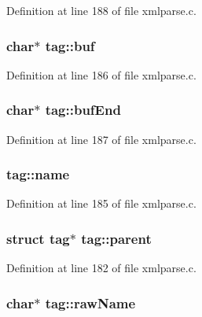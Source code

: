 Definition at line 188 of file xmlparse.\+c.

\subsubsection[{\texorpdfstring{buf}{buf}}]{\setlength{\rightskip}{0pt plus 5cm}char$\ast$ tag\+::buf}\hypertarget{structtag_a626e563f001ca3291df32c1a7511a0a9}{}\label{structtag_a626e563f001ca3291df32c1a7511a0a9}


Definition at line 186 of file xmlparse.\+c.

\subsubsection[{\texorpdfstring{buf\+End}{bufEnd}}]{\setlength{\rightskip}{0pt plus 5cm}char$\ast$ tag\+::buf\+End}\hypertarget{structtag_ac3cd2ddf9240b603d9326cd2ce1a7558}{}\label{structtag_ac3cd2ddf9240b603d9326cd2ce1a7558}


Definition at line 187 of file xmlparse.\+c.

\subsubsection[{\texorpdfstring{name}{name}}]{ tag\+::name}\hypertarget{structtag_ad80c412c77ff1e474b6e0b663b703963}{}\label{structtag_ad80c412c77ff1e474b6e0b663b703963}


Definition at line 185 of file xmlparse.\+c.

\subsubsection[{\texorpdfstring{parent}{parent}}]{\setlength{\rightskip}{0pt plus 5cm}struct {\bf tag}$\ast$ tag\+::parent}\hypertarget{structtag_a3b9ed02158a38c2889611bcf6d20aa36}{}\label{structtag_a3b9ed02158a38c2889611bcf6d20aa36}


Definition at line 182 of file xmlparse.\+c.

\subsubsection[{\texorpdfstring{raw\+Name}{rawName}}]{ char$\ast$ tag\+::raw\+Name}\hypertarget{structtag_a964cfb525c04ed04e49414c73feca8f1}{}\label{structtag_a964cfb525c04ed04e49414c73feca8f1}


